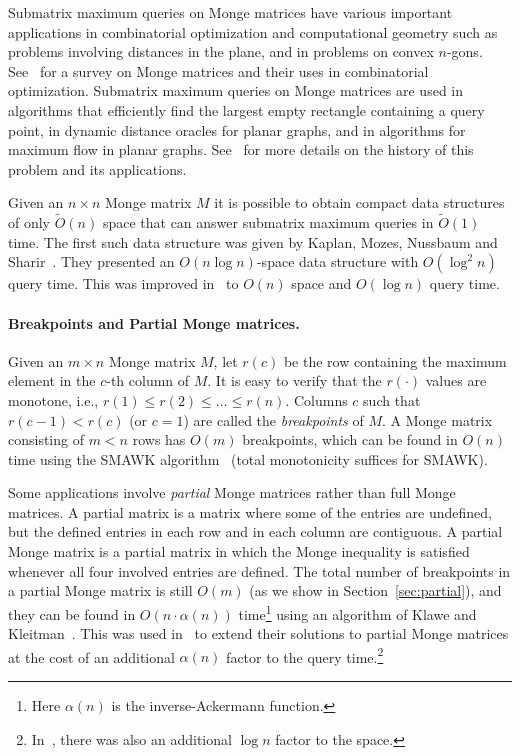\documentclass{llncs}
\begin{document}
Submatrix maximum queries on Monge matrices 
have various important applications in combinatorial optimization and computational
geometry 
such as problems involving distances in the plane, and in problems on
convex $n$-gons. 
See~\cite{BKR96} for a survey on Monge matrices and their uses in combinatorial
optimization. Submatrix maximum queries on Monge matrices are
used in algorithms that efficiently find the largest empty rectangle containing a
query point, in dynamic distance oracles for planar graphs,
and in algorithms for maximum flow in planar graphs.
See~\cite{KaplanMozesNussbaumSharir} for more details on the
history of this problem and its applications.

Given an $n \times n$ Monge matrix $M$ it is possible to obtain compact data structures of only $\tilde O(n)$ space that can answer submatrix maximum queries in $\tilde{O}(1)$ time.  The first such data structure was given by 
Kaplan, Mozes, Nussbaum and
Sharir~\cite{KaplanMozesNussbaumSharir}. 
They presented an $O(n\log n)$-space data structure with  $O(\log^2
n)$ query time.
This was improved in~\cite{ourICALP}  to $O(n)$ space and $O(\log n)$ query time.  

\paragraph{\bf Breakpoints and Partial Monge matrices.}
Given an $m\times n$ Monge matrix $M$, let $r(c)$ be the row containing the maximum element in the $c$-th
column of $M$. It is easy to verify that the $r(\cdot)$ values are monotone, i.e., $r(1)\leq r(2) \leq\ldots\leq r(n)$.
Columns $c$ such that $r(c-1)<r(c)$ (or $c=1$) are called the {\em breakpoints} of $M$. A Monge matrix
consisting of $m<n$ rows has $O(m)$ breakpoints, which can be found in
$O(n)$ time using the SMAWK algorithm~\cite{SMAWK} (total monotonicity
suffices for SMAWK). 

Some applications involve  {\em partial} Monge matrices rather than
full Monge matrices.
A partial matrix is a matrix where some of the
entries are undefined, but the defined entries in each row
and in each column are contiguous. A partial Monge matrix is a partial matrix in which the Monge inequality is satisfied whenever all four involved entries are defined. The total number of breakpoints in a partial Monge matrix is still $O(m)$ (as we show in Section~\ref{sec:partial}), and they can be found in $O(n\cdot \alpha(n))$ time\footnote{Here $\alpha(n)$ is the inverse-Ackermann function.} using an algorithm of Klawe and Kleitman~\cite{KK89}. This was used in~\cite{ourICALP,KaplanMozesNussbaumSharir} to extend their solutions to partial Monge matrices at the cost of an additional $\alpha(n)$ factor to the query time.\footnote{In~\cite{KaplanMozesNussbaumSharir}, there was also an additional $\log n$ factor to the space.}
\end{document}
